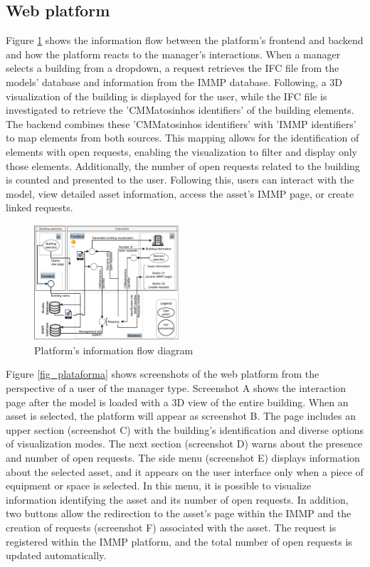 \documentclass[a4paper, 10pt, twocolumn, twoside]{article}
\begin{document}
\subsection{Web platform}
\label{subsec:platform}

Figure \ref{fig_fluxo} shows the information flow between the platform's frontend and backend and how the platform reacts to the manager's interactions. When a manager selects a building from a dropdown, a request retrieves the IFC file from the models' database and information from the IMMP database. Following, a 3D visualization of the building is displayed for the user, while the IFC file is investigated to retrieve the 'CMMatosinhos identifiers' of the building elements. The backend combines these 'CMMatosinhos identifiers' with 'IMMP identifiers' to map elements from both sources. This mapping allows for the identification of elements with open requests, enabling the visualization to filter and display only those elements. Additionally, the number of open requests related to the building is counted and presented to the user. Following this, users can interact with the model, view detailed asset information, access the asset's IMMP page, or create linked requests.

\begin{figure}[!htb]
    \centering
    \includegraphics[width=0.48\textwidth]{Images/fluxo.pdf}
    \caption{Platform's information flow diagram}
    \label{fig_fluxo}
\end{figure}

Figure \ref{fig_plataforma} shows screenshots of the web platform from the perspective of a user of the manager type. Screenshot A shows the interaction page after the model is loaded with a 3D view of the entire building. When an asset is selected, the platform will appear as screenshot B. The page includes an upper section (screenshot C) with the building's identification and diverse options of visualization modes. The next section (screenshot D) warns about the presence and number of open requests. The side menu (screenshot E) displays information about the selected asset, and it appears on the user interface only when a piece of equipment or space is selected. In this menu, it is possible to visualize information identifying the asset and its number of open requests. In addition, two buttons allow the redirection to the asset's page within the IMMP and the creation of requests (screenshot F) associated with the asset. The request is registered within the IMMP platform, and the total number of open requests is updated automatically.
\end{document}

